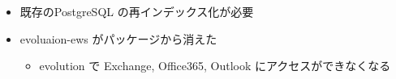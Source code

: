 \documentclass[cjk,c,squeeze,shrink,dvipdfmx,12pt]{beamer}
\begin{document}
\begin{frame}
  \begin{itemize}
  \item 既存のPostgreSQL の再インデックス化が必要 
  \item evoluaion-ews がパッケージから消えた
  \begin{itemize}
    \item evolution で Exchange, Office365, Outlook にアクセスができなくなる 
  \end{itemize}
  \end{itemize}
\end{frame}




%
\end{document}
